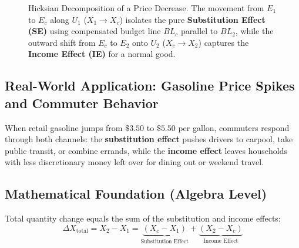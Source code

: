 \documentclass[11pt,letterpaper]{article}
\begin{document}
\begin{figure}[htbp]
\caption{Hicksian Decomposition of a Price Decrease. The movement from $E_1$ to $E_c$ along $U_1$ ($X_1 \to X_c$) isolates the pure \textbf{Substitution Effect (SE)} using compensated budget line $BL_c$ parallel to $BL_2$, while the outward shift from $E_c$ to $E_2$ onto $U_2$ ($X_c \to X_2$) captures the \textbf{Income Effect (IE)} for a normal good.}
\label{fig:income_substitution_effects}
\end{figure}

\subsection*{Real-World Application: Gasoline Price Spikes and Commuter Behavior}
When retail gasoline jumps from $\$3.50$ to $\$5.50$ per gallon, commuters respond through both channels: the \textbf{substitution effect} pushes drivers to carpool, take public transit, or combine errands, while the \textbf{income effect} leaves households with less discretionary money left over for dining out or weekend travel.

\subsection*{Mathematical Foundation (Algebra Level)}
Total quantity change equals the sum of the substitution and income effects:
\begin{equation}
\Delta X_{\text{total}} = X_2 - X_1 = \underbrace{(X_c - X_1)}_{\text{Substitution Effect}} + \underbrace{(X_2 - X_c)}_{\text{Income Effect}}
\end{equation}
\end{document}
